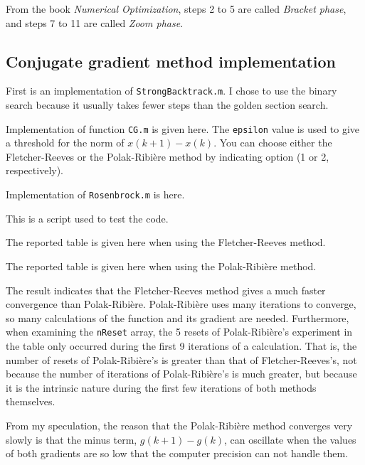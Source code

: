 \documentclass{article}
\begin{document}
From the book \emph{Numerical Optimization}, steps 2 to 5 are called \emph{Bracket phase}, and steps 7 to 11 are called \emph{Zoom phase}.

\subsection*{Conjugate gradient method implementation}

First is an implementation of \lstinline{StrongBacktrack.m}. I chose to use the binary search because it usually takes fewer steps than the golden section search.



Implementation of function \lstinline{CG.m} is given here. The \lstinline{epsilon} value is used to give a threshold for the norm of $x(k+1)-x(k)$. You can choose either the Fletcher-Reeves or the Polak-Ribière method by indicating option (1 or 2, respectively).



Implementation of \lstinline{Rosenbrock.m} is here.



This is a script used to test the code.



The reported table is given here when using the Fletcher-Reeves method.



The reported table is given here when using the Polak-Ribière method.



The result indicates that the Fletcher-Reeves method gives a much faster convergence than Polak-Ribière. Polak-Ribière uses many iterations to converge, so many calculations of the function and its gradient are needed. Furthermore, when examining the \lstinline{nReset} array, the 5 resets of Polak-Ribière's experiment in the table only occurred during the first 9 iterations of a calculation. That is, the number of resets of Polak-Ribière's is greater than that of Fletcher-Reeves's, not because the number of iterations of Polak-Ribière's is much greater, but because it is the intrinsic nature during the first few iterations of both methods themselves.

From my speculation, the reason that the Polak-Ribière method converges very slowly is that the minus term, $g(k+1)-g(k)$, can oscillate when the values of both gradients are so low that the computer precision can not handle them.
\end{document}
